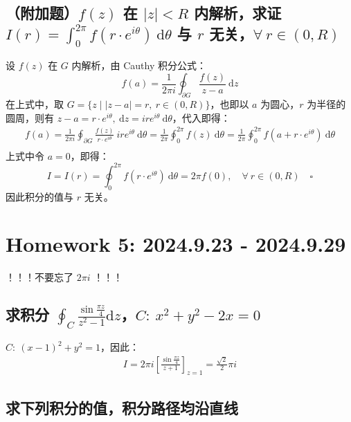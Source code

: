 \documentclass[UTF8]{report}
\theoremstyle{MyLineTheoremStyle} %
\theoremstyle{MyBlockTheoremStyle} %
\theoremstyle{MySubsubsectionStyle} %
\begin{document}
\section{（附加题）$f(z)$ 在 $| z | < R$ 内解析，求证 $\displaystyle I(r) = \int_{0}^{2\pi} f(r\cdot e^{i \theta}) \ \mathrm{d}\theta$ 与 $r$ 无关，$\forall\  r \in (0, R)$}

设 $f(z)$ 在 $G$ 内解析，由 Cauthy 积分公式：
\begin{equation*}
f(a) = \frac{1}{2\pi i} \oint_{\partial G} \frac{f(z)}{z - a}\ \mathrm{d}z
\end{equation*}
在上式中，取 $G = \{ z \mid |z - a| = r,\ r \in (0, R)\}$，也即以 $a$ 为圆心，$r$ 为半径的圆周，则有 $z - a = r\cdot e^{i \theta},\ \mathrm{d}z = ire^{i \theta}\ \mathrm{d}\theta $，代入即得：
\begin{gather*}
f(a) 
= \frac{1}{2\pi i} \oint_{\partial G} \frac{f(z)}{r\cdot e^{i \theta}}\ ire^{i \theta}\ \mathrm{d}\theta 
= \frac{1}{2 \pi} \oint_{0}^{2\pi}  f(z)\ \mathrm{d}\theta
= \frac{1}{2 \pi} \oint_{0}^{2\pi}  f(a + r\cdot e^{i \theta})\ \mathrm{d}\theta \\ 
\end{gather*}
上式中令 $a = 0$，即得：
\begin{equation}
    I = I(r) = \oint_{0}^{2\pi} f(r\cdot e^{i \theta})\ \mathrm{d}\theta = 2 \pi f(0),\quad \forall\ r \in (0, R)   \quad\square
\end{equation}
因此积分的值与 $r$ 无关。

\chapter{Homework 5: 2024.9.23 - 2024.9.29}
\thispagestyle{fancy}

{\color{red}\large ！！！不要忘了 $2 \pi i$ ！！！}

\section{求积分 $\displaystyle \oint_C \frac{\sin \frac{\pi z}{4}}{z^2 - 1} \mathrm{d} z$，$C:\ x^2 + y^2 -2x = 0$}

$C:\  (x - 1)^2 + y^2 =1$，因此：
\begin{gather}
I 
= 2 \pi i \left[ \frac{\sin \frac{\pi z}{4}}{z + 1} \right]_{z = 1} = \frac{\sqrt{2}}{2} \pi i
\end{gather}

\section{求下列积分的值，积分路径均沿直线}
\end{document}
